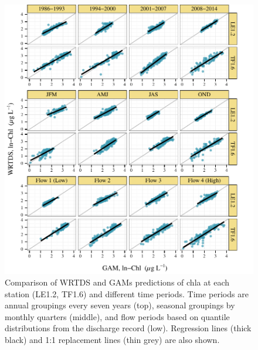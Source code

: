 \documentclass[letterpaper,12pt,oneside]{article}\usepackage[]{graphicx}\usepackage[]{color}
\makeatletter
\def\maxwidth{ %
  \ifdim\Gin@nat@width>\linewidth
    \linewidth
  \else
    \Gin@nat@width
  \fi
}
\makeatother
\begin{document}
\begin{figure}[!ht]

{\centering \includegraphics[width=\maxwidth]{figs/wrtdsvgam-1} 

}

\caption[Comparison of \ac{WRTDS} and \acp{GAM} predictions of \ac{chla} at each station (LE1]{Comparison of \ac{WRTDS} and \acp{GAM} predictions of \ac{chla} at each station (LE1.2, TF1.6) and different time periods.  Time periods are annual groupings every seven years (top), seasonal groupings by monthly quarters (middle), and flow periods based on quantile distributions from the discharge record (low).  Regression lines (thick black) and 1:1 replacement lines (thin grey) are also shown.}\label{fig:wrtdsvgam}
\end{figure}





\end{document}
